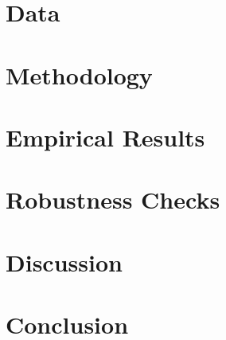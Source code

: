 \documentclass[12pt,a4paper]{report}
\begin{document}
\chapter{Data}
\label{ch:data}

\chapter{Methodology}
\label{ch:methodology}

\chapter{Empirical Results}
\label{ch:results}

\chapter{Robustness Checks}
\label{ch:robustness}

\chapter{Discussion}
\label{ch:discussion}

\chapter{Conclusion}
\label{ch:conclusion}

\printbibliography[heading=bibintoc, title={참고문헌 / References}]

\end{document}
